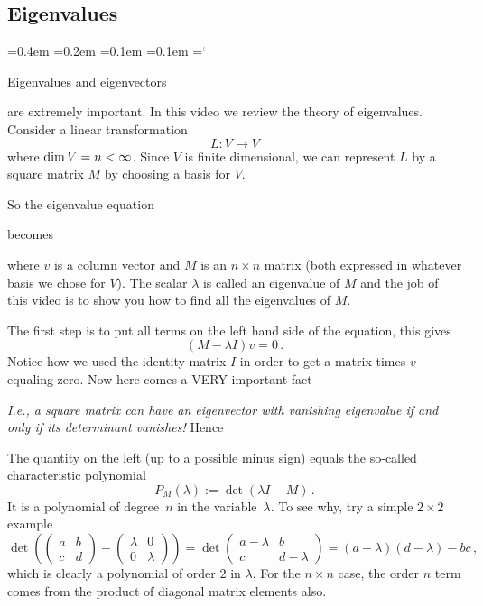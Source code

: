 
\subsection*{Eigenvalues}

{\ttfamily
{}\font=0.4em
\font=0.2em
\font=0.1em
\font=0.1em
\hyphenchar\font=`\-


\hypertarget{scripts_eigenvalues_and_eigenvectors_ii_lecture}{Eigenvalues and eigenvectors}
are extremely important. In this video we review the theory of eigenvalues.
Consider a linear transformation 
\[L:V\longrightarrow V\]
where  $\operatorname{dim} V=n<\infty$. Since $V$ is finite dimensional, we can represent $L$ by a square matrix $M$
by choosing a basis for $V$.

So the eigenvalue equation
\begin{center}
\end{center}
becomes
\begin{center}
\end{center}
where $v$ is a column vector and $M$ is an $n\times n$ matrix (both expressed in whatever basis we chose for $V$).
The scalar $\lambda$ is called an eigenvalue of $M$ and the job of this video is to show you how to find all the eigenvalues of $M$.


The first step is to put all terms on the left hand side of the equation, this gives
\[
(M-\lambda I) v = 0\, .
\]
Notice how we used the identity matrix $I$ in order to get a matrix times $v$ equaling zero. Now here comes a VERY important fact
\begin{center}
\end{center}
{\itshape I.e., a square matrix can  have an eigenvector with vanishing eigenvalue if and only if its determinant vanishes!}
Hence
\begin{center}
\end{center}
The quantity on the left (up to a possible minus sign) equals the so-called characteristic polynomial
\[
P_M(\lambda):=\det(\lambda I - M)\, .
\]
It is a polynomial of degree~$n$ in the variable~$\lambda$. To see why, try a simple $2\times 2$ example
\[
\det\left(\begin{pmatrix}a & b\\c & d\end{pmatrix}-\begin{pmatrix}\lambda & 0\\0 & \lambda\end{pmatrix}\right)=
\det\begin{pmatrix}a-\lambda & b\\c & d-\lambda\end{pmatrix}=(a-\lambda)(d-\lambda)-bc\, ,
\]
which is clearly a polynomial of order $2$ in $\lambda$. For the $n\times n$ case, the order $n$ term comes from the product of diagonal matrix elements also.

}
